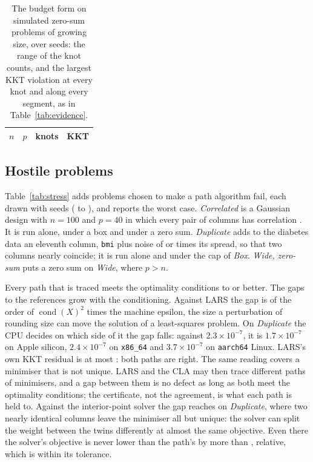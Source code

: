 \documentclass[11pt]{article}
\theoremstyle{remark}
\begin{document}
\begin{table}[!htbp]
\centering
\small
\begin{tabular}{rrrc}
\toprule
$n$ & $p$ & knots & KKT \\
\midrule

\end{tabular}
\caption{The budget form on simulated zero-sum problems of growing size, over
\scSeeds{} seeds: the range of the knot counts, and the largest KKT violation at every
knot and along every segment, as in Table~\ref{tab:evidence}.}
\label{tab:scale}
\end{table}

\subsection{Hostile problems}
\label{sec:hostile}

Table~\ref{tab:stress} adds problems chosen to make a path algorithm fail, each drawn with
\stSeeds{} seeds (\stSeedFirst{} to \stSeedLast{}), and reports the worst case. \emph{Correlated} is a Gaussian design
with $n=100$ and $p=40$ in which every pair of columns has correlation \stRho{}. It is
run alone, under a box and under a zero sum. \emph{Duplicate} adds to the diabetes data
an eleventh column, \texttt{bmi} plus noise of \stEpsHi{} or \stEpsLo{} times its
spread, so that two columns nearly coincide; it is run alone and under the cap of
\emph{Box}.
\emph{Wide, zero-sum} puts a zero sum on \emph{Wide}, where $p>n$.

Every path that is traced meets the optimality conditions to \stKKT{} or better. The
gaps to the references grow with the conditioning. Against LARS the gap is of the order
of $\operatorname{cond}(X)^2$ times the machine epsilon, the size a perturbation of
rounding size can move the solution of a least-squares problem. On \emph{Duplicate} the
CPU decides on which side of it the gap falls: against $2.3\times10^{-7}$, it is
$1.7\times10^{-7}$ on Apple silicon, $2.4\times10^{-7}$ on \texttt{x86\_64} and
$3.7\times10^{-7}$ on \texttt{aarch64} Linux. LARS's own KKT residual is at most
\stLarsKKT{}: both paths are right. The same reading covers a minimiser that is
not unique. LARS and the CLA may then trace different paths of minimisers, and a gap
between them is no defect as long as both meet the optimality conditions; the
certificate, not the agreement, is what each path is held to. Against the interior-point solver the gap
reaches \stIpmGap{} on \emph{Duplicate}, where two nearly identical columns leave the
minimiser all but unique: the solver can split the weight between the twins differently
at almost the same objective. Even there the solver's objective is never lower than the
path's by more than \stIpmBetter{}, relative, which is within its tolerance.
\end{document}
